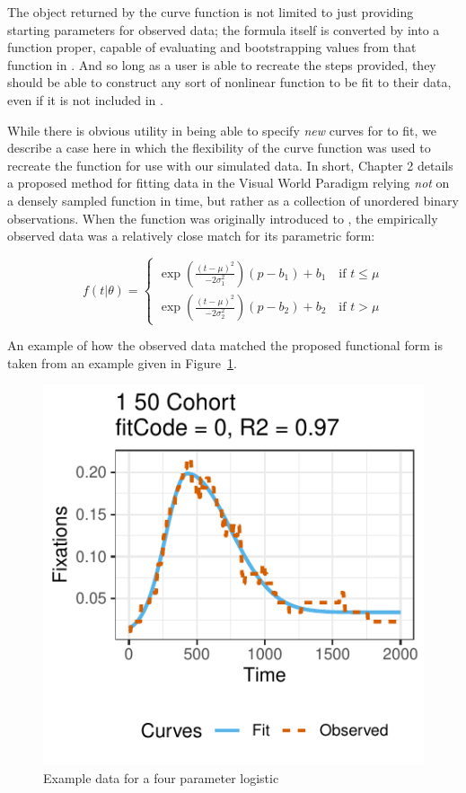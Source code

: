 The object returned by the curve function is not limited to just providing starting parameters for observed data; the formula itself is converted by  into a function proper, capable of evaluating and bootstrapping values from that function in . And so long as a user is able to recreate the steps provided, they should be able to construct any sort of nonlinear function to be fit to their data, even if it is not included in .

While there is obvious utility in being able to specify \textit{new} curves for  to fit, we describe a case here in which the flexibility of the curve function was used to recreate the  function for use with our simulated data. In short, Chapter 2 details a proposed method for fitting data in the Visual World Paradigm relying \textit{not} on a densely sampled function in time, but rather as a collection of unordered binary observations. When the  function was originally introduced to , the empirically observed data was a relatively close match for its parametric form:

\begin{equation}
f(t|\theta) = \begin{cases}
\exp \left( \frac{(t - \mu)^2}{-2\sigma_1^2} \right) (p - b_1) + b_1 \quad \text{if } t \leq \mu \\
\exp \left( \frac{(t - \mu)^2}{-2\sigma_2^2} \right) (p - b_2) + b_2 \quad \text{if } t > \mu
\end{cases}
\end{equation}

An example of how the observed data matched the proposed functional form is taken from an example given in Figure~\ref{fig:bdots_log}.

\begin{figure}[H]
\centering
\includegraphics[scale=1]{img/bdots_logistic.pdf}
\caption{Example data for a four parameter logistic}
\label{fig:bdots_log}
\end{figure}

